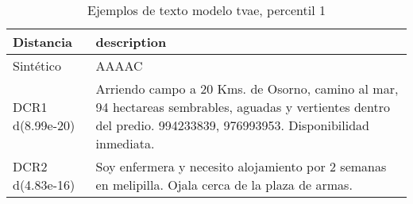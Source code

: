 \begin{table}[H]
\centering
\fontsize{10}{14}\selectfont
\caption{Ejemplos de texto modelo tvae, percentil 1}
\label{table-example-economicos-b-2-tvae-1p-text}
\begin{tabular}{|l|m{35em}|}
\hline
\rowcolor[gray]{0.8}
Distancia & description \\
\hline Sintético & AAAAC \\
\hline DCR1 d(8.99e-20) & Arriendo campo a 20 Kms. de Osorno, camino al mar, 94 hectareas sembrables, aguadas y vertientes dentro del predio. 994233839, 976993953. Disponibilidad inmediata. \\
\hline DCR2 d(4.83e-16) & Soy enfermera y necesito alojamiento por 2 semanas en melipilla. Ojala cerca de la plaza de armas. \\
\hline
\end{tabular}
\end{table}
